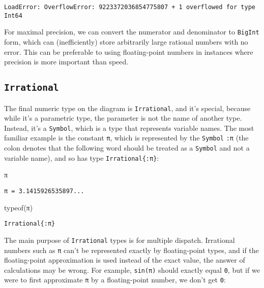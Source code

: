 \documentclass[
  letterpaper,
  DIV=11,
  numbers=noendperiod]{scrreprt}
\newenvironment{Shaded}{\begin{snugshade}}{\end{snugshade}}
\newcommand{\ConstantTok}[1]{\textcolor[rgb]{0.56,0.35,0.01}{#1}}
\newcommand{\FunctionTok}[1]{\textcolor[rgb]{0.28,0.35,0.67}{#1}}
\newcommand{\NormalTok}[1]{\textcolor[rgb]{0.00,0.23,0.31}{#1}}
\begin{document}
\begin{verbatim}
LoadError: OverflowError: 9223372036854775807 + 1 overflowed for type Int64
\end{verbatim}

For maximal precision, we can convert the numerator and denominator to
\texttt{BigInt} form, which can (inefficiently) store arbitrarily large
rational numbers with no error. This can be preferable to using
floating-point numbers in instances where precision is more important
than speed.

\hypertarget{irrational}{%
\subsection{\texorpdfstring{\texttt{Irrational}}{Irrational}}\label{irrational}}

The final numeric type on the diagram is \texttt{Irrational}, and it's
special, because while it's a parametric type, the parameter is not the
name of another type. Instead, it's a \texttt{Symbol}, which is a type
that represents variable names. The most familiar example is the
constant \texttt{π}, which is represented by the \texttt{Symbol}
\texttt{:π} (the colon denotes that the following word should be treated
as a \texttt{Symbol} and not a variable name), and so has type
\texttt{Irrational\{:π\}}:

\begin{Shaded}
\begin{Highlighting}[]
\ConstantTok{π}
\end{Highlighting}
\end{Shaded}

\begin{verbatim}
π = 3.1415926535897...
\end{verbatim}

\begin{Shaded}
\begin{Highlighting}[]
\FunctionTok{typeof}\NormalTok{(}\ConstantTok{π}\NormalTok{)}
\end{Highlighting}
\end{Shaded}

\begin{verbatim}
Irrational{:π}
\end{verbatim}

The main purpose of \texttt{Irrational} types is for multiple dispatch.
Irrational numbers such as \texttt{π} can't be represented exactly by
floating-point types, and if the floating-point approximation is used
instead of the exact value, the answer of calculations may be wrong. For
example, \texttt{sin(π)} should exactly equal \texttt{0}, but if we were
to first approximate \texttt{π} by a floating-point number, we don't get
\texttt{0}:
\end{document}
